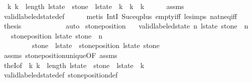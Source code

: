 \begin{isabellebody}
\ {\isachardoublequoteopen}{\isasymforall}\ k{\isacharprime}{\isachardot}\ k{\isacharprime}\ {\isacharless}\ length\ l{\isacharunderscore}state\ {\isasymand}\ stone\ {\isasymin}\ l{\isacharunderscore}state\ {\isacharbang}\ k{\isacharprime}\ {\isasymlongrightarrow}\ k\ {\isacharequal}\ k{\isacharprime}{\isachardoublequoteclose}\isanewline
\ \ \ \ \isamarkupfalse%
\ assms\isanewline
\ \ \ \ \isamarkupfalse%
\ valid{\isacharunderscore}labeled{\isacharunderscore}state{\isacharunderscore}def\isanewline
\ \ \ \ \isamarkupfalse%
\ {\isacharparenleft}metis\ IntI\ Suc{\isacharunderscore}eq{\isacharunderscore}plus{}\ empty{\isacharunderscore}iff\ le{\isacharunderscore}simps{\isacharparenleft}{}{\isacharparenright}\ nat{\isacharunderscore}neq{\isacharunderscore}iff{\isacharparenright}\isanewline
\ \ \isamarkupfalse%
\ {\isacharquery}thesis\isanewline
\ \ \ \ \isamarkupfalse%
\ {\isacharasterisk}\isanewline
\ \ \ \ \isamarkupfalse%
\ auto\isanewline
{}\isamarkupfalse%
%
\endisatagproof
{\isafoldproof}%
%
\isadelimproof
\isanewline
%
\endisadelimproof
\isanewline
{}\isamarkupfalse%
\ stone{\isacharunderscore}position{\isacharcolon}\isanewline
\ \ \ {\isachardoublequoteopen}valid{\isacharunderscore}labeled{\isacharunderscore}state\ n\ l{\isacharunderscore}state{\isachardoublequoteclose}\ {\isachardoublequoteopen}stone\ {\isacharless}\ n{\isachardoublequoteclose}\isanewline
\ \ \ {\isachardoublequoteopen}stone{\isacharunderscore}position\ l{\isacharunderscore}state\ stone\ {\isasymle}\ n\ {\isasymand}\ \isanewline
\ \ \ \ \ \ \ \ \ stone\ {\isasymin}\ l{\isacharunderscore}state\ {\isacharbang}\ {\isacharparenleft}stone{\isacharunderscore}position\ l{\isacharunderscore}state\ stone{\isacharparenright}{\isachardoublequoteclose}\isanewline
%
\isadelimproof
\ \ %
\endisadelimproof
%
\isatagproof
{}\isamarkupfalse%
\ assms\ stone{\isacharunderscore}position{\isacharunderscore}unique{\isacharbrackleft}OF\ assms{\isacharbrackright}\isanewline
\ \ \isamarkupfalse%
\ theI{\isacharbrackleft}of\ {\isachardoublequoteopen}{\isasymlambda}\ k{\isachardot}\ k\ {\isacharless}\ length\ l{\isacharunderscore}state\ {\isasymand}\ stone\ {\isasymin}\ l{\isacharunderscore}state\ {\isacharbang}\ k{\isachardoublequoteclose}{\isacharbrackright}\isanewline
\ \ \isamarkupfalse%
\ valid{\isacharunderscore}labeled{\isacharunderscore}state{\isacharunderscore}def\ stone{\isacharunderscore}position{\isacharunderscore}def\isanewline

\end{isabellebody}
